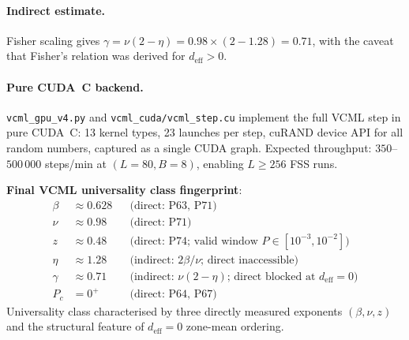 \documentclass[11pt]{article}
\begin{document}
\paragraph{Indirect estimate.}
Fisher scaling gives $\gamma=\nu(2-\eta)=0.98\times(2-1.28)=\mathbf{0.71}$,
with the caveat that Fisher's relation was derived for $d_\mathrm{eff}>0$.

\paragraph{Pure CUDA~C backend.}
\texttt{vcml\_gpu\_v4.py} and \texttt{vcml\_cuda/vcml\_step.cu} implement the full
VCML step in pure CUDA~C: 13 kernel types, 23 launches per step, cuRAND device API
for all random numbers, captured as a single CUDA graph.
Expected throughput: $350$--$500\,000$ steps/min at $(L=80,B=8)$, enabling $L\geq256$
FSS runs.

\textbf{Final VCML universality class fingerprint}:
\begin{align*}
  \beta   &\approx 0.628  &&\text{(direct: P63, P71)} \\
  \nu     &\approx 0.98   &&\text{(direct: P71)} \\
  z       &\approx 0.48   &&\text{(direct: P74; valid window }P\in[10^{-3},10^{-2}]\text{)} \\
  \eta    &\approx 1.28   &&\text{(indirect: }2\beta/\nu\text{; direct inaccessible)} \\
  \gamma  &\approx 0.71   &&\text{(indirect: }\nu(2-\eta)\text{; direct blocked at }d_\mathrm{eff}=0\text{)} \\
  P_c     &= 0^+          &&\text{(direct: P64, P67)}
\end{align*}
Universality class characterised by three directly measured exponents $(\beta,\nu,z)$
and the structural feature of $d_\mathrm{eff}=0$ zone-mean ordering.
\end{document}
